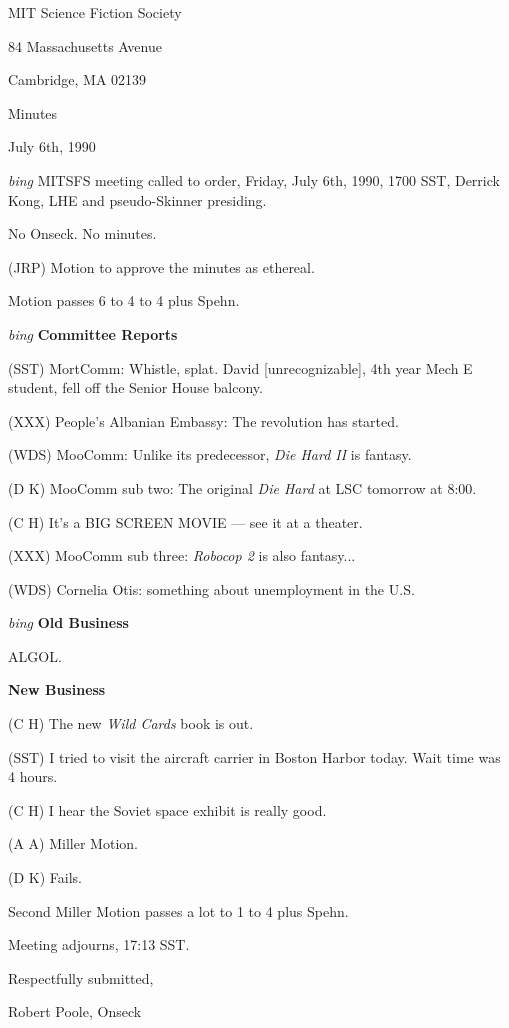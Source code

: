 \setlength{\topmargin}{-0.5in}
\setlength{\oddsidemargin}{0.0in}
\setlength{\evensidemargin}{0.0in}
\setlength{\textheight}{9in}
\setlength{\textwidth}{6.5in}



\begin{center}
MIT Science Fiction Society

84 Massachusetts Avenue

Cambridge, MA 02139

\vspace{0.2in}
Minutes

July 6th, 1990

\end{center}
 
\vspace{0.15in}
{\em bing\/}  MITSFS meeting called to order, Friday, July 6th, 1990,
1700 SST, Derrick Kong, LHE and pseudo-Skinner presiding.

No Onseck.  No minutes.

(JRP) Motion to approve the minutes as ethereal.

Motion passes 6 to 4 to 4 plus Spehn.

\vspace{.15in}
{\em bing\/} {\bf Committee Reports\/}

(SST) MortComm: Whistle, splat.  David [unrecognizable], 4th year Mech E
student, fell off the Senior House balcony.

(XXX) People's Albanian Embassy: The revolution has started.

(WDS) MooComm: Unlike its predecessor, {\em Die Hard II\/} is fantasy.

(D K) MooComm sub two: The original {\em Die Hard\/} at LSC tomorrow at 8:00.

(C H) It's a BIG SCREEN MOVIE --- see it at a theater.

(XXX) MooComm sub three: {\em Robocop 2\/} is also fantasy...

(WDS) Cornelia Otis: something about unemployment in the U.S.

\vspace{.15in}
{\em bing\/} {\bf Old Business\/}

ALGOL.

\vspace{0.15in}
{\bf New Business\/}

(C H) The new {\em Wild Cards\/} book is out.

(SST) I tried to visit the aircraft carrier in Boston Harbor today.  Wait time
was 4 hours.

(C H) I hear the Soviet space exhibit is really good.

(A A) Miller Motion.

(D K) Fails.

Second Miller Motion passes a lot to 1 to 4 plus Spehn.

Meeting adjourns, 17:13 SST.

\vspace{0.15in}
\begin{center}
Respectfully submitted,

Robert Poole, Onseck
\end{center}

